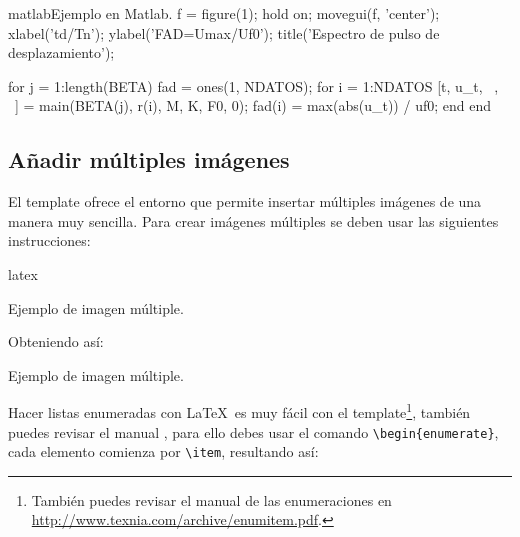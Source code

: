 \begin{sourcecode}{matlab}{Ejemplo en Matlab.}
	f = figure(1); hold on; movegui(f, 'center');
	xlabel('td/Tn'); ylabel('FAD=Umax/Uf0');
	title('Espectro de pulso de desplazamiento');
	
	for j = 1:length(BETA)
	fad = ones(1, NDATOS); %
	for i = 1:NDATOS
	[t, u_t, ~, ~] = main(BETA(j), r(i), M, K, F0, 0);
	fad(i) = max(abs(u_t)) / uf0;
	end
	end
\end{sourcecode}

\subsection{Añadir múltiples imágenes}

El template ofrece el entorno \href{https://latex.ppizarror.com/informe.html#hlp-images}{} que permite insertar múltiples imágenes de una manera muy sencilla. Para crear imágenes múltiples se deben usar las siguientes instrucciones:

\begin{sourcecode}{latex}{}
\begin{images}[\label{imagenmultiple}]{Ejemplo de imagen múltiple.}
	\imagesnewline
\end{images}
\end{sourcecode}

Obteniendo así:

\begin{images}{Ejemplo de imagen múltiple.}
	\imagesnewline
\end{images}

\newpage
{}


		Hacer listas enumeradas con \LaTeX\ es muy fácil con el template\footnote{También puedes revisar el manual de las enumeraciones en \url{http://www.texnia.com/archive/enumitem.pdf}.}, también puedes revisar el manual \cite{templatelatex}, para ello debes usar el comando \texttt{\textbackslash begin\{enumerate\}}, cada elemento comienza por \texttt{\textbackslash item}, resultando así:

